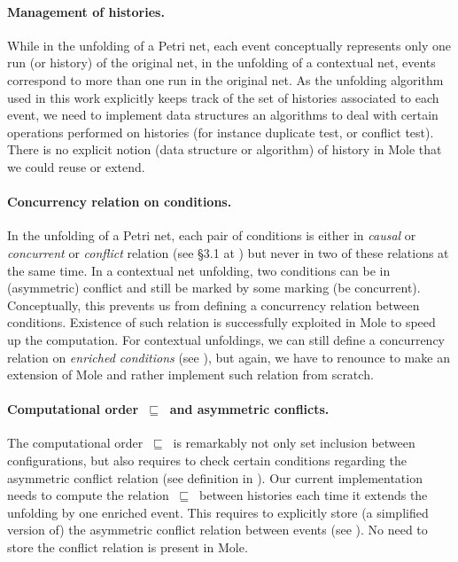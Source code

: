 \documentclass[11pt,a4paper]{article}
\newcommand{\evolves}{{\ensuremath{\ \sqsubseteq \ }}}
\begin{document}
\paragraph{Management of histories.}  While in the unfolding of a Petri net,
each event conceptually represents only one run (or history) of the original
net, in the unfolding of a contextual net, events correspond to more than one
run in the original net.  As the unfolding algorithm used in this work
explicitly keeps track of the set of histories associated to each event, we
need to implement data structures an algorithms to deal with certain operations
performed on histories (for instance duplicate test, or conflict test).  There
is no explicit notion (data structure or algorithm) of history in Mole that we
could reuse or extend.

\paragraph{Concurrency relation on conditions.}  In the unfolding of a Petri
net, each pair of conditions is either in \emph{causal} or \emph{concurrent} or
\emph{conflict} relation (see \S3.1 at ) but never in two of these
relations at the same time.  In a contextual net unfolding, two conditions can
be in (asymmetric) conflict and still be marked by some marking (be
concurrent).  Conceptually, this prevents us from defining a concurrency
relation between conditions.  Existence of such relation is successfully
exploited in Mole to speed up the computation.  For contextual unfoldings, we
can still define a concurrency relation on \emph{enriched conditions} (see
), but again, we have to renounce to make an extension of
Mole and rather implement such relation from scratch.

\paragraph{Computational order $\evolves$ and asymmetric conflicts.}  The
computational order $\evolves$ is remarkably not only set inclusion between
configurations, but also requires to check certain conditions regarding the
asymmetric conflict relation (see definition in ).  Our
current implementation needs to compute the relation $\evolves$ between
histories each time it extends the unfolding by one enriched event.  This
requires to explicitly store (a simplified version of) the asymmetric conflict
relation between events (see ).  No need to store the
conflict relation is present in Mole.
\end{document}
